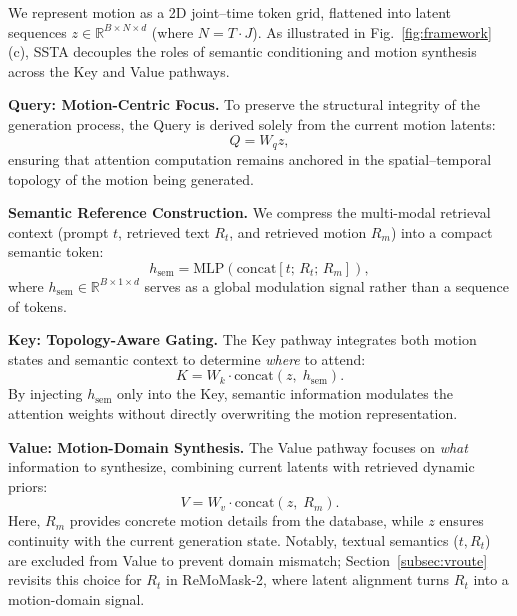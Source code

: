 \documentclass[10pt,journal,compsoc]{IEEEtran}
\newcommand{\myparagraph}[1]{\textbf{#1}\hspace{1.8ex}}
\begin{document}
We represent motion as a 2D joint–time token grid, flattened into latent sequences $z \in \mathbb{R}^{B \times N \times d}$ (where $N = T \cdot J$). As illustrated in Fig.~\ref{fig:framework}(c), SSTA decouples the roles of semantic conditioning and motion synthesis across the Key and Value pathways.

\noindent \myparagraph{Query: Motion-Centric Focus.}
To preserve the structural integrity of the generation process, the Query is derived solely from the current motion latents:
\begin{equation}
Q = W_q z,
\end{equation}
ensuring that attention computation remains anchored in the spatial–temporal topology of the motion being generated.

\noindent \myparagraph{Semantic Reference Construction.}
We compress the multi-modal retrieval context (prompt $t$, retrieved text $R_t$, and retrieved motion $R_m$) into a compact semantic token:
\begin{equation}
h_{\mathrm{sem}} = \mathrm{MLP}\!\left(
\mathrm{concat}[t;\, R_t;\, R_m]
\right),
\end{equation}
where $h_{\mathrm{sem}} \in \mathbb{R}^{B \times 1 \times d}$ serves as a global modulation signal rather than a sequence of tokens.

\noindent \myparagraph{Key: Topology-Aware Gating.}
The Key pathway integrates both motion states and semantic context to determine \emph{where} to attend:
\begin{equation}
K = W_k \cdot
\mathrm{concat}\!\left(z,\; h_{\mathrm{sem}}\right).
\end{equation}
By injecting $h_{\mathrm{sem}}$ only into the Key, semantic information modulates the attention weights without directly overwriting the motion representation.

\noindent \myparagraph{Value: Motion-Domain Synthesis.}
The Value pathway focuses on \emph{what} information to synthesize, combining current latents with retrieved dynamic priors:
\begin{equation}
V = W_v \cdot
\mathrm{concat}\!\left(z,\; R_m\right).
\end{equation}
Here, $R_m$ provides concrete motion details from the database, while $z$ ensures continuity with the current generation state. Notably, textual semantics ($t, R_t$) are excluded from Value to prevent domain mismatch; Section~\ref{subsec:vroute} revisits this choice for $R_t$ in ReMoMask-2, where latent alignment turns $R_t$ into a motion-domain signal.
\end{document}

